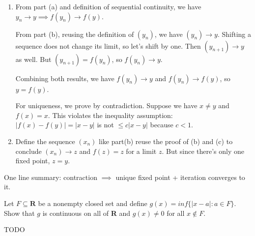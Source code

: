 \documentclass{oxmathproblems}
\begin{document}
\begin{questions}
\begin{solution}
\begin{enumerate}[label=(\alph*)]
    We go back to the definition of Cauchy sequence. For any $\epsilon > 0$, we need to find $N$ such that $|y_{m}-y_{n}| < \epsilon$ for all $m > n \geq N$. By triangle inequality:
    \begin{align*}
      |y_{m}-y_{n}| 
      &\leq |y_{m}-y_{m-1}| + |y_{m-1}-y_{m-2}| + ... + |y_{n+1}-y_{n}| \\
      &\leq (c^{m-2} + c^{m-3} + ... + c^{n-1})|y_{2}-y_{1}|
    \end{align*}
    We can bound the geometric terms as small as we want by choosing big enough $N$. To prove it, we first bound it by an infinite geometric "tail":
    \[(c^{n}+...+c^{m}) \leq (c^{n} + c^{n+1} + ...)\]
    (I shifted the original index $n-1$ to $n$ for simplicity).

    Since $|c| < 1$, by the geometric series formula, $\sum_{k=n}^{\infty}c^{k}=\frac{c^{n}}{1-c}$. Now, as we pick larger $N$, then $\lim_{n \to \infty}\frac{c^{n}}{1-c}=0$
    because $c^{n} \to 0$. Basically, geometric tail gets smaller as we choose farther starting point.
 
    \item From part (a) and definition of sequential continuity, we have $y_{n} \to y \implies f(y_{n}) \to f(y)$.
    
    From part (b), reusing the definition of $(y_{n})$, we have $(y_{n}) \to y$. Shifting a sequence does not change its limit, so let's shift by one. Then $(y_{n+1}) \to y$ as well.
    But $(y_{n+1})=f(y_{n})$, so $f(y_{n}) \to y$.

    Combining both results, we have $f(y_{n}) \to y$ and $f(y_{n}) \to f(y)$, so $y=f(y)$.

    For uniqueness, we prove by contradiction. Suppose we have $x \neq y$ and $f(x)=x$. This violates the inequality assumption: $|f(x)-f(y)|=|x-y|$ is not $\leq c|x-y|$ because $c < 1$.

    \item Define the sequence $(x_{n})$ like part(b) reuse the proof of (b) and (c) to conclude $(x_{n}) \to z$ and $f(z)=z$ for a limit $z$. But since there's only one fixed point, $z=y$.
  \end{enumerate}

  One line summary: contraction $\implies$ unique fixed point + iteration converges to it.
\end{solution}

\miquestion Let $F \subseteq \textbf{R}$ be a nonempty closed set and define $g(x) = inf\{|x-a| : a \in F\}$. Show that $g$ is continuous on all of \textbf{R} and
$g(x) \neq 0$ for all $x \notin F$.
\begin{solution}
  TODO
\end{solution}


\end{questions}
\end{document}

